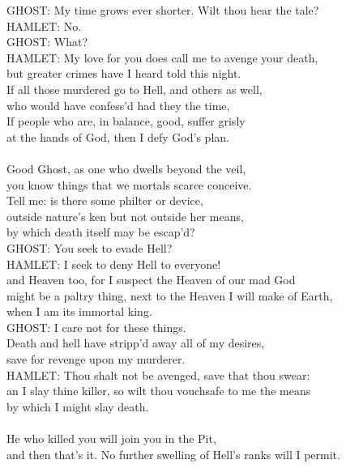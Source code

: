 \begin{playdialog}
GHOST: My time grows ever shorter. Wilt thou hear the tale?\\

HAMLET: No.\\

GHOST: What?\\

HAMLET: My love for you does call me to avenge your death,\\
but greater crimes have I heard told this night.\\
If all those murdered go to Hell, and others as well,\\
who would have confess'd had they the time,\\
If people who are, in balance, good, suffer grisly\\
at the hands of God, then I defy God's plan.\\
\\
Good Ghost, as one who dwells beyond the veil,\\
you know things that we mortals scarce conceive.\\
Tell me: is there some philter or device,\\
outside nature's ken but not outside her means,\\
by which death itself may be escap'd?\\

GHOST: You seek to evade Hell?\\

HAMLET: I seek to deny Hell to everyone!\\
and Heaven too, for I suspect the Heaven of our mad God\\
might be a paltry thing, next to the Heaven I will make of Earth,\\
when I am its immortal king.\\

GHOST: I care not for these things.\\
Death and hell have stripp'd away all of my desires,\\
save for revenge upon my murderer.\\

HAMLET: Thou shalt not be avenged, save that thou swear:\\
an I slay thine killer, so wilt thou vouchsafe to me the means\\
by which I might slay death.\\
\\
He who killed you will join you in the Pit,\\
and then that's it. No further swelling of Hell's ranks will I permit.\\


\end{playdialog}
